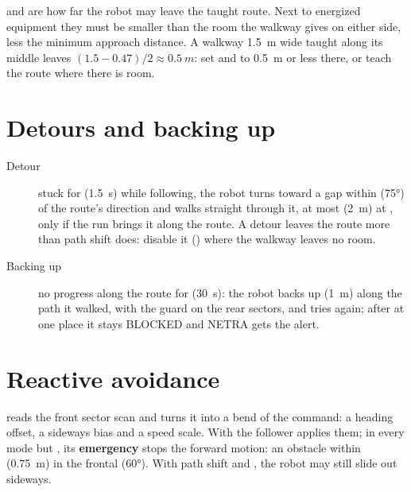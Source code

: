 \begin{dangerbox}
 and  are how far the robot may leave the taught route.
Next to energized equipment they must be smaller than the room the walkway gives on either side,
less the minimum approach distance. A walkway \SI{1.5}{m} wide taught along its middle leaves
$(1.5 - 0.47)/2 \approx \SI{0.5}{m}$: set  and  to
\SI{0.5}{m} or less there, or teach the route where there is room.
\end{dangerbox}

\section{Detours and backing up}

\begin{description}
  \item[Detour] stuck for  (\SI{1.5}{s}) while following, the robot turns
    toward a gap within  (\ang{75}) of the route's direction and walks straight
    through it, at most  (\SI{2}{m}) at , only if the run brings it
     along the route. A detour leaves the route more than path shift does:
    disable it () where the walkway leaves no room.
  \item[Backing up] no progress along the route for  (\SI{30}{s}): the
    robot backs up  (\SI{1}{m}) along the path it walked, with the guard on the
    rear sectors, and tries again; after  at one place it stays BLOCKED and
    NETRA gets the alert.
\end{description}

\section{Reactive avoidance}

 reads the front sector scan and turns it into a bend of the
command: a heading offset, a sideways bias and a speed scale. With 
the follower applies them; in every mode but , its \textbf{emergency} stops the forward
motion: an obstacle within  (\SI{0.75}{m}) in the frontal
 (\ang{60}). With path shift and , the robot may
still slide out sideways.


